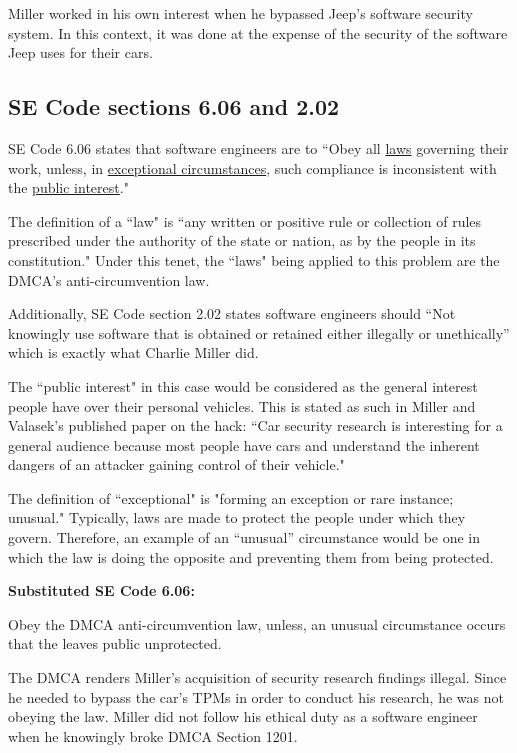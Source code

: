 \documentclass[12pt]{article}
\begin{document}
\begin{multicols}{2}
Miller worked in his own interest when he bypassed Jeep's software security system. In this context, it was done at the expense of the security of the software Jeep uses for their cars. 




\subsection{SE Code sections 6.06 and 2.02}
SE Code 6.06 states that software engineers are to ``Obey all \underline{laws} governing their work, unless, in \underline{exceptional circumstances}, such compliance is inconsistent with the \underline{public interest}."\cite{seCode}

The definition of a ``law" is ``any written or positive rule or collection of rules prescribed under the authority of the state or nation, as by the people in its constitution."\cite{dictionary} Under this tenet, the ``laws" being applied to this problem are the DMCA's anti-circumvention law. 

Additionally, SE Code section 2.02 states software engineers should ``Not knowingly use software that is obtained or retained either illegally or unethically'' \cite{seCode} which is exactly what Charlie Miller did.

The ``public interest" in this case would be considered as the general interest people have over their personal vehicles. This is stated as such in Miller and Valasek's published paper on the hack: ``Car security research is interesting for a general audience because most people have cars and understand the inherent dangers of an attacker gaining control of their vehicle." \cite{officialPaper}

The definition of ``exceptional" is "forming an exception or rare instance; unusual." \cite{dictionary} Typically, laws are made to protect the people under which they govern. Therefore, an example of an ``unusual'' circumstance would be one in which the law is doing the opposite and preventing them from being protected.

\vspace{.5cm}\textbf{Substituted SE Code 6.06:}\vspace{.25cm}

Obey the DMCA anti-circumvention law, unless, an unusual circumstance occurs that the leaves public unprotected.

The DMCA renders Miller's acquisition of security research findings illegal.  Since he needed to bypass the car's TPMs in order to conduct his research, he was not obeying the law. Miller did not follow his ethical duty as a software engineer when he knowingly broke DMCA Section 1201.


\end{multicols}
\end{document}
